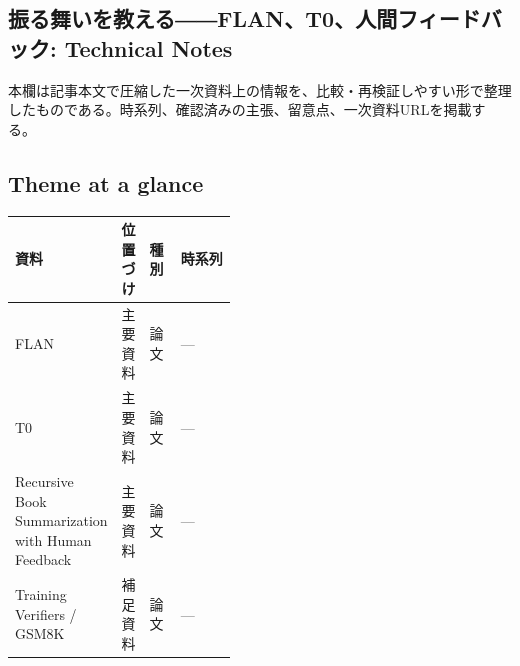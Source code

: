 \subsection*{振る舞いを教える――FLAN、T0、人間フィードバック: Technical Notes}
本欄は記事本文で圧縮した一次資料上の情報を、比較・再検証しやすい形で整理したものである。時系列、確認済みの主張、留意点、一次資料URLを掲載する。
\smallskip
{}\par
\medskip
\subsection*{Theme at a glance}
\begin{center}
\footnotesize
\begin{tabularx}{\linewidth}{@{}p{0.20\linewidth}p{0.10\linewidth}p{0.14\linewidth}X@{}}
\toprule
資料 & 位置づけ & 種別 & 時系列 \\
\midrule
FLAN & 主要資料 & 論文 & — \\
T0 & 主要資料 & 論文 & — \\
Recursive Book Summarization with Human Feedback & 主要資料 & 論文 & — \\
Training Verifiers / GSM8K & 補足資料 & 論文 & — \\
\bottomrule
\end{tabularx}
\end{center}
\normalsize

